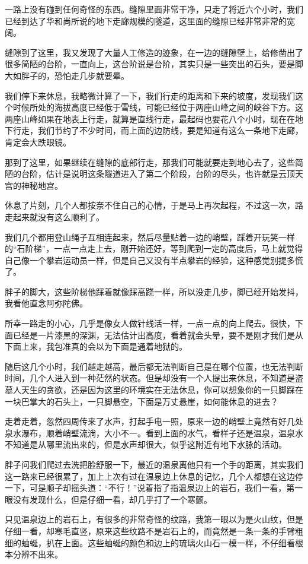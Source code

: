 一路上没有碰到任何奇怪的东西。缝隙里面非常干净，只走了将近六个小时，我们已经到达了华和尚所说的地下走廊规模的隧道，这里面的缝隙已经非常非常的宽阔。

缝隙到了这里，我又发现了大量人工修造的迹象，在一边的缝隙壁上，给修凿出了很多简陋的台阶，一直向上，这台阶说是台阶，其实只是一些突出的石头，要是脚大如胖子的，恐怕走几步就要晕。

我们停下来休息，我略微计算了一下，我们行走的距离和下来的坡度，发现我们这个时候所处的海拔高度已经低于雪线，可能已经位于两座山峰之间的峡谷下方。这两座山峰如果在地表上行走，就算是直线行走，最起码也要花八个小时，现在在地下行走，我们节约了不少时间，而上面的边防线，要是知道有这么一条地下走廊，肯定会大跌眼镜。

那到了这里，如果继续在缝隙的底部行走，那我们可能就要走到地心去了，这些简陋的台阶，估计是说明这条隧道进入了第二个阶段，台阶的尽头，也许就是云顶天宫的神秘地宫。

休息了片刻，几个人都按奈不住自己的心情，于是马上再次起程，不过这一次，路走起来就没有这么顺利了。

我们几个都用登山绳子互相连起来，然后尽量贴着一边的峭壁，踩着开玩笑一样的“石阶梯”，一点一点走上去，刚开始还好，等到爬到一定的高度后，马上就觉得自己像一个攀岩运动员一样，但是自己又没有半点攀岩的经验，这种感觉别提多慌了。

胖子的脚大，这些阶梯他踩着就像踩高跷一样，所以没走几步，脚已经开始发抖，我看他直念阿弥陀佛。

所幸一路走的小心，几乎是像女人做针线活一样，一点一点的向上爬去。很快，下面已经是一片漆黑的深渊，无法估计出高度，看着就会头晕，要不是刚才我们是从下面上来，我包准真的会以为下面是通着地狱的。

随后这几个小时，我们越走越高，最后都无法判断自己是在哪个位置，也无法判断时间，几个人进入到一种茫然的状态。但是却没有一个人提出来休息，不知道是盗墓人天生的贪欲，还是因为这里的环境实在无法休息，你可以想象你的一只脚踩在一块巴掌大的石头上，一只脚悬空，下面是万丈悬崖，如何能休息的进去？

走着走着，忽然四周传来了水声，打起手电一照，原来一边的峭壁上竟然有好几处泉水瀑布，顺着峭壁流淌，大小不一。看到上面的水气，看样子还是温泉，温泉水不知道是从哪里流出来的，但是水声却很大，似乎这附近有地下水脉的活动。

胖子问我们爬过去洗把脸舒服一下，最近的温泉离他只有一个手的距离，其实我们这一路来已经很累了，加上上次有过在温泉边上休息的记忆，几个人都想在这边停一下，可是顺子却摇头道：“不行！”说着指了指温泉边上的岩石，我们一看，第一眼没有发现什么，但是仔细一看，却几乎打了一个寒颤。

只见温泉边上的岩石上，有很多的非常奇怪的纹路，我第一眼以为是火山纹，但是仔细一看，却寒毛直竖，原来这些纹路不是岩石上的，而竟然是一条一条的手臂粗细的蚰蜒，扒在上面。这些蚰蜒的颜色和边上的琉璃火山石一模一样，不仔细看根本分辨不出来。

